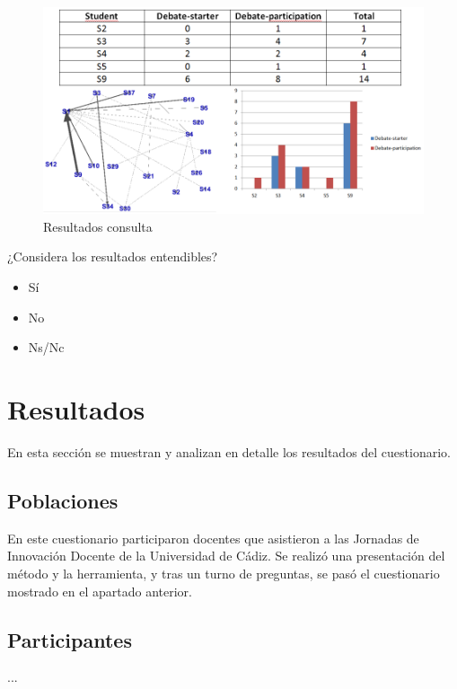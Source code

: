 \begin{figure}[H]
  \begin{center}
    \includegraphics[scale=0.4]{ResultadosConsulta.png}
  \end{center}
  \caption{Resultados consulta}
  \label{fig:ape:resultados:consulta}
\end{figure}

\begin{mdframed}[style=cuestionarioST]
	¿Considera los resultados entendibles?
			\begin{itemize}
				\item Sí
				\item No
				\item Ns/Nc
			\end{itemize}
\end{mdframed}



\newpage

\section{Resultados} \label{apc:eval:metodo:resultados}

En esta sección se muestran y analizan en detalle los resultados del cuestionario. %

\subsection{Poblaciones}

En este cuestionario participaron docentes que asistieron a las Jornadas de Innovación Docente de la Universidad de Cádiz. Se realizó una presentación del método y la herramienta, y tras un turno de preguntas, se pasó el cuestionario mostrado en el apartado anterior.



\subsection{Participantes}

...

